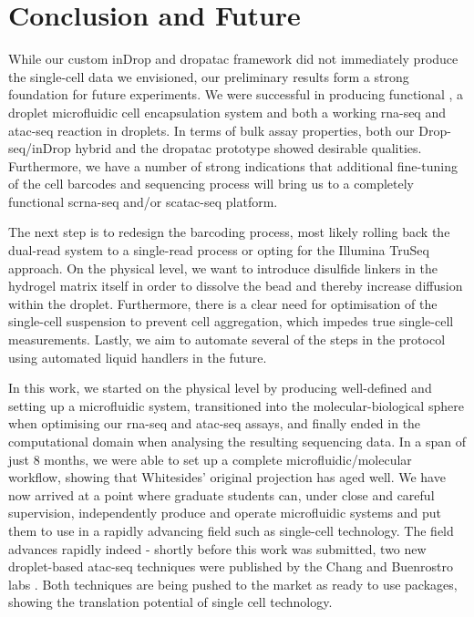 \chapter{Conclusion and Future}
\label{ch:conclusion}
While our custom inDrop and \acrshort{dropatac} framework did not immediately produce the single-cell data we envisioned, our preliminary results form a strong foundation for future experiments. We were successful in producing functional , a droplet microfluidic cell encapsulation system and both a working \acrshort{rna-seq} and \acrshort{atac-seq} reaction in droplets. In terms of bulk assay properties, both our Drop-seq/inDrop hybrid and the \acrshort{dropatac} prototype showed desirable qualities. Furthermore, we have a number of strong indications that additional fine-tuning of the cell barcodes and sequencing process will bring us to a completely functional \acrshort{scrna-seq} and/or \acrshort{scatac-seq} platform.\pms


The next step is to redesign the barcoding process, most likely rolling back the dual-read system to a single-read process or opting for the Illumina TruSeq approach. On the physical level, we want to introduce disulfide linkers in the hydrogel matrix itself in order to dissolve the bead and thereby increase diffusion within the droplet. Furthermore, there is a clear need for optimisation of the single-cell suspension to prevent cell aggregation, which impedes true single-cell measurements. Lastly, we aim to automate several of the steps in the protocol using automated liquid handlers in the future.\pms

In this work, we started on the physical level by producing well-defined  and setting up a microfluidic system, transitioned into the molecular-biological sphere when optimising our \acrshort{rna-seq} and \acrshort{atac-seq} assays, and finally ended in the computational domain when analysing the resulting sequencing data. In a span of just 8 months, we were able to set up a complete microfluidic/molecular workflow, showing that Whitesides' original projection has aged well. We have now arrived at a point where graduate students can, under close and careful supervision, independently produce and operate microfluidic systems and put them to use in a rapidly advancing field such as single-cell technology. The field advances rapidly indeed - shortly before this work was submitted, two new droplet-based \acrshort{atac-seq} techniques were published by the Chang and Buenrostro labs \citep{satpathy2019,lareau2019}. Both techniques are being pushed to the market as ready to use packages, showing the translation potential of single cell technology.\pms

